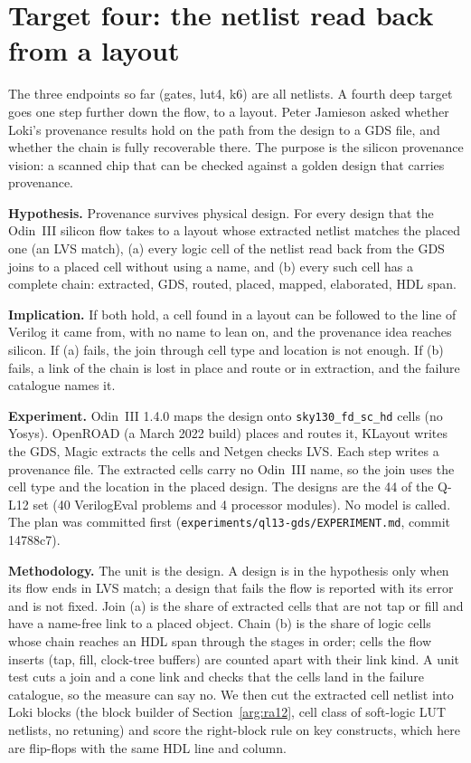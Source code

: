 \documentclass[conference]{IEEEtran}
\newcommand{\hev}[1]{\par\smallskip\noindent\textbf{#1}}
\newcommand{\code}[1]{\texttt{#1}}
\begin{document}
\section{Target four: the netlist read back from a layout}
\label{sec:ql13}
\label{arg:ql13}

The three endpoints so far (gates, lut4, k6) are all netlists. A fourth deep target goes one step further down the flow, to a layout. Peter Jamieson asked whether Loki's provenance results hold on the path from the design to a GDS file, and whether the chain is fully recoverable there. The purpose is the silicon provenance vision: a scanned chip that can be checked against a golden design that carries provenance.

\hev{Hypothesis.} Provenance survives physical design. For every design that the Odin~III silicon flow takes to a layout whose extracted netlist matches the placed one (an LVS match), (a) every logic cell of the netlist read back from the GDS joins to a placed cell without using a name, and (b) every such cell has a complete chain: extracted, GDS, routed, placed, mapped, elaborated, HDL span.

\hev{Implication.} If both hold, a cell found in a layout can be followed to the line of Verilog it came from, with no name to lean on, and the provenance idea reaches silicon. If (a) fails, the join through cell type and location is not enough. If (b) fails, a link of the chain is lost in place and route or in extraction, and the failure catalogue names it.

\hev{Experiment.} Odin~III 1.4.0 maps the design onto \code{sky130\_fd\_sc\_hd} cells (no Yosys). OpenROAD (a March 2022 build) places and routes it, KLayout writes the GDS, Magic extracts the cells and Netgen checks LVS. Each step writes a provenance file. The extracted cells carry no Odin~III name, so the join uses the cell type and the location in the placed design. The designs are the 44 of the Q-L12 set (40 VerilogEval problems and 4 processor modules). No model is called. The plan was committed first (\code{experiments/}\allowbreak\code{ql13-gds/EXPERIMENT.md}, commit 14788c7).

\hev{Methodology.} The unit is the design. A design is in the hypothesis only when its flow ends in LVS match; a design that fails the flow is reported with its error and is not fixed. Join (a) is the share of extracted cells that are not tap or fill and have a name-free link to a placed object. Chain (b) is the share of logic cells whose chain reaches an HDL span through the stages in order; cells the flow inserts (tap, fill, clock-tree buffers) are counted apart with their link kind. A unit test cuts a join and a cone link and checks that the cells land in the failure catalogue, so the measure can say no. We then cut the extracted cell netlist into Loki blocks (the block builder of Section~\ref{arg:ra12}, cell class of soft-logic LUT netlists, no retuning) and score the right-block rule on key constructs, which here are flip-flops with the same HDL line and column.
\end{document}
